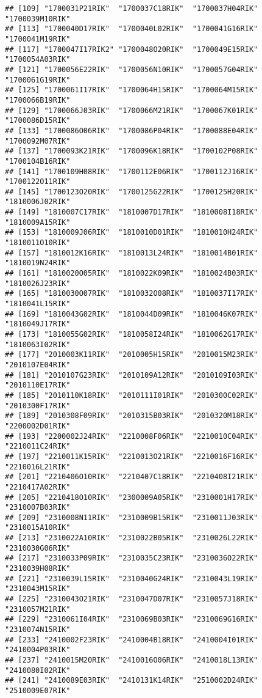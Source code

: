 \documentclass[
]{article}
\begin{document}
\begin{verbatim}
## [109] "1700031P21RIK"  "1700037C18RIK"  "1700037H04RIK"  "1700039M10RIK" 
## [113] "1700040D17RIK"  "1700040L02RIK"  "1700041G16RIK"  "1700041M19RIK" 
## [117] "1700047I17RIK2" "1700048O20RIK"  "1700049E15RIK"  "1700054A03RIK" 
## [121] "1700056E22RIK"  "1700056N10RIK"  "1700057G04RIK"  "1700061G19RIK" 
## [125] "1700061I17RIK"  "1700064H15RIK"  "1700064M15RIK"  "1700066B19RIK" 
## [129] "1700066J03RIK"  "1700066M21RIK"  "1700067K01RIK"  "1700086D15RIK" 
## [133] "1700086O06RIK"  "1700086P04RIK"  "1700088E04RIK"  "1700092M07RIK" 
## [137] "1700093K21RIK"  "1700096K18RIK"  "1700102P08RIK"  "1700104B16RIK" 
## [141] "1700109H08RIK"  "1700112E06RIK"  "1700112J16RIK"  "1700122O11RIK" 
## [145] "1700123O20RIK"  "1700125G22RIK"  "1700125H20RIK"  "1810006J02RIK" 
## [149] "1810007C17RIK"  "1810007D17RIK"  "1810008I18RIK"  "1810009A15RIK" 
## [153] "1810009J06RIK"  "1810010D01RIK"  "1810010H24RIK"  "1810011O10RIK" 
## [157] "1810012K16RIK"  "1810013L24RIK"  "1810014B01RIK"  "1810019N24RIK" 
## [161] "1810020O05RIK"  "1810022K09RIK"  "1810024B03RIK"  "1810026J23RIK" 
## [165] "1810030O07RIK"  "1810032O08RIK"  "1810037I17RIK"  "1810041L15RIK" 
## [169] "1810043G02RIK"  "1810044D09RIK"  "1810046K07RIK"  "1810049J17RIK" 
## [173] "1810055G02RIK"  "1810058I24RIK"  "1810062G17RIK"  "1810063I02RIK" 
## [177] "2010003K11RIK"  "2010005H15RIK"  "2010015M23RIK"  "2010107E04RIK" 
## [181] "2010107G23RIK"  "2010109A12RIK"  "2010109I03RIK"  "2010110E17RIK" 
## [185] "2010110K18RIK"  "2010111I01RIK"  "2010300C02RIK"  "2010300F17RIK" 
## [189] "2010308F09RIK"  "2010315B03RIK"  "2010320M18RIK"  "2200002D01RIK" 
## [193] "2200002J24RIK"  "2210008F06RIK"  "2210010C04RIK"  "2210011C24RIK" 
## [197] "2210011K15RIK"  "2210013O21RIK"  "2210016F16RIK"  "2210016L21RIK" 
## [201] "2210406O10RIK"  "2210407C18RIK"  "2210408I21RIK"  "2210417A02RIK" 
## [205] "2210418O10RIK"  "2300009A05RIK"  "2310001H17RIK"  "2310007B03RIK" 
## [209] "2310008N11RIK"  "2310009B15RIK"  "2310011J03RIK"  "2310015A10RIK" 
## [213] "2310022A10RIK"  "2310022B05RIK"  "2310026L22RIK"  "2310030G06RIK" 
## [217] "2310033P09RIK"  "2310035C23RIK"  "2310036O22RIK"  "2310039H08RIK" 
## [221] "2310039L15RIK"  "2310040G24RIK"  "2310043L19RIK"  "2310043M15RIK" 
## [225] "2310043O21RIK"  "2310047D07RIK"  "2310057J18RIK"  "2310057M21RIK" 
## [229] "2310061I04RIK"  "2310069B03RIK"  "2310069G16RIK"  "2310074N15RIK" 
## [233] "2410002F23RIK"  "2410004B18RIK"  "2410004I01RIK"  "2410004P03RIK" 
## [237] "2410015M20RIK"  "2410016O06RIK"  "2410018L13RIK"  "2410080I02RIK" 
## [241] "2410089E03RIK"  "2410131K14RIK"  "2510002D24RIK"  "2510009E07RIK" 

\end{verbatim}
\end{document}
